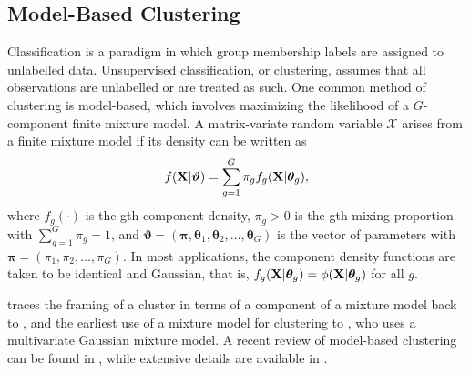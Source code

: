 \documentclass[12pt, centerh1]{article}
\begin{document}
\subsection{Model-Based Clustering}
Classification is a paradigm in which group membership labels are assigned to unlabelled data. Unsupervised classification, or clustering, assumes that all observations are unlabelled or are treated as such. One common method of clustering is model-based, which involves maximizing the likelihood of a $G$-component finite mixture model. A matrix-variate random variable $\mathscr{X}$ arises from a finite mixture model if its density can be written as
\begin{equation*}
f({\bf X} | \bm{\vartheta}) = \sum_{g=1}^G \pi_g f_g({\bf X} | \bm{\theta}_g),
\end{equation*}
where $f_g(\cdot)$ is the gth component density, $\pi_g >0$ is the gth mixing proportion with $\sum_{g=1}^G\pi_g = 1$, and $\bm{\vartheta} = (\bm{\pi}, \bm{\theta}_1, \bm{\theta}_2, \dots, \bm{\theta}_G)$ is the vector of parameters with $\bm{\pi} = (\pi_1, \pi_2, \dots, \pi_G)$. In most applications, the component density functions are taken to be identical and Gaussian, that is, $f_g({\bf X} | \bm{\theta}_g) = \phi({\bf X} | \bm{\theta}_g)$ for all $g$.

\citet{mcnicholas2016b} traces the framing of a cluster in terms of a component of a mixture model back to \citet{tiedeman1955}, and the earliest use of a mixture model for clustering to \citet{wolfe1965}, who uses a multivariate Gaussian mixture model. A recent review of model-based clustering can be found in \citet{mcnicholas2016b}, while extensive details are available in \citet{mcnicholas2016a}. 


\end{document}
